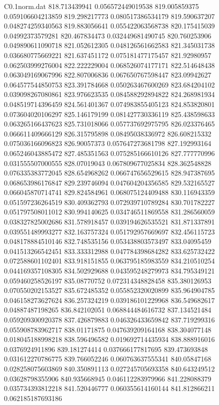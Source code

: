 \begin{filecontents}{C0.1norm.dat}
818.713439941		0.056572449019538
819.005859375		0.059106604213859
819.298217773		0.080517386534179
819.590637207		0.048274259340563
819.883056641		0.055422063568738
820.175415039		0.04992373579281
820.467834473		0.032449681490745
820.760253906		0.049890611090718
821.052612305		0.048126561662583
821.345031738		0.036680775669221
821.637451172		0.075181477175457
821.92980957		0.062503999276004
822.222229004		0.068526074177171
822.514648438		0.063049169067996
822.807006836		0.067650767598447
823.09942627		0.064577544850753
823.391784668		0.050263467600269
823.684204102		0.039098267080861
823.976623535		0.084588292894822
824.268981934		0.048519714396459
824.561401367		0.074983855405123
824.853820801		0.073604020106297
825.146179199		0.081427730336119
825.438598633		0.063265166437623
825.731018066		0.057737692975795
826.023376465		0.066611409666129
826.315795898		0.08495038336972
826.608215332		0.075036166096823
826.90057373		0.057647273681798
827.192993164		0.065246043885472
827.485351563		0.075285166610126
827.777770996		0.031555507000555
828.07019043		0.067809677025834
828.362548828		0.076335383772045
828.654968262		0.066747656529615
828.947387695		0.068653986176847
829.239746094		0.047604204356585
829.532165527		0.066045870714741
829.824584961		0.068075124409488
830.116943359		0.051597236264519
830.409362793		0.072939710789284
830.701782227		0.051797508011012
830.994140625		0.034746511869558
831.286560059		0.038327825002686
831.578918457		0.039194626535521
831.871337891		0.039551489993277
832.163757324		0.051792957669697
832.456115723		0.048178884510146
832.748535156		0.053438803573497
833.04095459		0.041513266542451
833.333312988		0.047784398684282
833.625732422		0.072588601102401
833.918151855		0.063795185983559
834.210510254		0.044169357108305
834.502929688		0.043595248279973
834.795349121		0.059460258526197
835.08770752		0.072314348828458
835.380126953		0.070550202153527
835.672485352		0.055852320020899
835.964904785		0.046158273627624
836.257324219		0.039186101229968
836.549682617		0.04887487198265
836.842102051		0.068844484616732
837.134521484		0.059209300920378
837.426879883		0.046326433659842
837.719299316		0.055908783962717
838.01171875		0.047639209164168
838.304077148		0.018045188998218
838.596496582		0.019692714435934
838.888916016		0.0376924911896
839.181274414		0.037666177817695
839.473693848		0.031612270786775
839.766052246		0.060763637555341
840.05847168		0.028258075603869
840.350891113		0.027245705693358
840.643249512		0.03628798355906
840.935668945		0.046112283979966
841.228088379		0.035734393812218
841.520446777		0.060355614160144
841.812866211		0.062185187693186

\end{filecontents}
